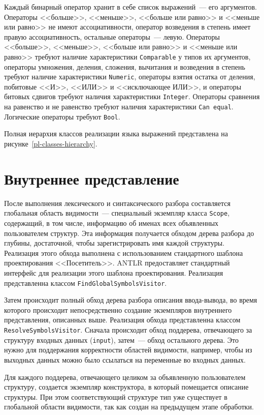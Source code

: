\documentclass[times,specification,annotation]{style/itmo-student-thesis/itmo-student-thesis}
\begin{document}
Каждый бинарный оператор хранит в себе список выражений~--- его аргументов. Операторы <<больше>>, <<меньше>>, <<больше или равно>> и <<меньше или равно>> не имеют ассоциативности, оператор возведения в степень имеет правую ассоциативность, остальные операторы~--- левую. Операторы <<больше>>, <<меньше>>, <<больше или равно>> и <<меньше или равно>> требуют наличие характеристики \texttt{Comparable} у типов их аргументов, операторы умножения, деления, сложения, вычитания и возведения в степень требуют наличие характеристики \texttt{Numeric}, операторы взятия остатка от деления, побитовые <<И>>, <<ИЛИ>> и <<исключающее ИЛИ>>, и операторы битовых сдвигов требуют наличия характеристики \texttt{Integer}. Операторы сравнения на равенство и не равенство требуют наличия характеристики \texttt{Can equal}. Логические операторы требуют \texttt{Bool}.

Полная иерархия классов реализации языка выражений представлена на рисунке~\ref{pl-classes-hierarchy}.

\section{Внутреннее представление}

После выполнения лексического и синтаксического разбора составляется глобальная область видимости~--- специальный экземпляр класса \texttt{Scope}, содержащий, в том числе, информацию об именах всех объявленных пользователем структур. Эта информация получается обходом дерева разбора до глубины, достаточной, чтобы зарегистрировать имя каждой структуры. Реализация этого обхода выполнена с использованием стандартного шаблона проектирования <<Посетитель>>. ANTLR предоставляет стандартный интерфейс для реализации этого шаблона проектирования. Реализация представленна классом \texttt{FindGlobalSymbolsVisitor}.

Затем происходит полный обход дерева разбора описания ввода-вывода, во время которого происходит непосредственно создание экземпляров внутреннего представления, описанных выше. Реализация обхода представленна классом \texttt{ResolveSymbolsVisitor}. Сначала происходит обход поддерева, отвечающего за структуру входных данных (\texttt{input}), затем~--- обход остального дерева. Это нужно для поддержания корректности областей видимости, например, чтобы из выходных данных можно было ссылаться на переменные во входных данных.

Для каждого поддерева, отвечающего целиком за объявленную пользователем структуру, создается экземпляр конструктора, в который помещается описание структуры. При этом соответствующий структуре тип уже существует в глобальной области видимости, так как создан на предыдущем этапе обработки.
\end{document}
